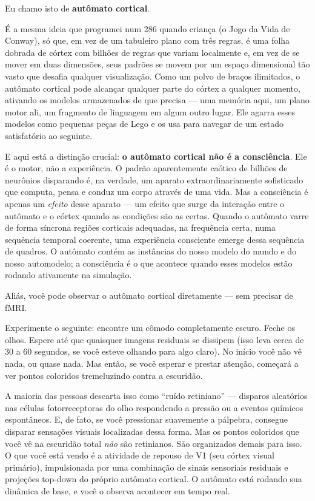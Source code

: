 \documentclass[11pt, twoside, openright]{book}
\begin{document}
Eu chamo isto de \textbf{autômato cortical}.

É a mesma ideia que programei num 286 quando criança (o Jogo da Vida de Conway), só que, em vez de um tabuleiro plano com três regras, é uma folha dobrada de córtex com bilhões de regras que variam localmente e, em vez de se mover em duas dimensões, seus padrões se movem por um espaço dimensional tão vasto que desafia qualquer visualização. Como um polvo de braços ilimitados, o autômato cortical pode alcançar qualquer parte do córtex a qualquer momento, ativando os modelos armazenados de que precisa --- uma memória aqui, um plano motor ali, um fragmento de linguagem em algum outro lugar. Ele agarra esses modelos como pequenas peças de Lego e os usa para navegar de um estado satisfatório ao seguinte.

E aqui está a distinção crucial: \textbf{o autômato cortical não é a consciência}. Ele é o motor, não a experiência. O padrão aparentemente caótico de bilhões de neurônios disparando é, na verdade, um aparato extraordinariamente sofisticado que computa, pensa e conduz um corpo através de uma vida. Mas a consciência é apenas um \textit{efeito} desse aparato --- um efeito que surge da interação entre o autômato e o córtex quando as condições são as certas. Quando o autômato varre de forma síncrona regiões corticais adequadas, na frequência certa, numa sequência temporal coerente, uma experiência consciente emerge dessa sequência de quadros. O autômato contém as instâncias do nosso modelo do mundo e do nosso automodelo; a consciência é o que acontece quando esses modelos estão rodando ativamente na simulação.

Aliás, você pode observar o autômato cortical diretamente --- sem precisar de fMRI.

Experimente o seguinte: encontre um cômodo completamente escuro. Feche os olhos. Espere até que quaisquer imagens residuais se dissipem (isso leva cerca de 30 a 60 segundos, se você esteve olhando para algo claro). No início você não vê nada, ou quase nada. Mas então, se você esperar e prestar atenção, começará a ver pontos coloridos tremeluzindo contra a escuridão.

A maioria das pessoas descarta isso como ``ruído retiniano'' --- disparos aleatórios nas células fotorreceptoras do olho respondendo a pressão ou a eventos químicos espontâneos. E, de fato, se você pressionar suavemente a pálpebra, consegue disparar sensações visuais localizadas dessa forma. Mas os pontos coloridos que você vê na escuridão total \textit{não} são retinianos. São organizados demais para isso. O que você está vendo é a atividade de repouso de V1 (seu córtex visual primário), impulsionada por uma combinação de sinais sensoriais residuais e projeções top-down do próprio autômato cortical. O autômato está rodando sua dinâmica de base, e você o observa acontecer em tempo real.
\end{document}
